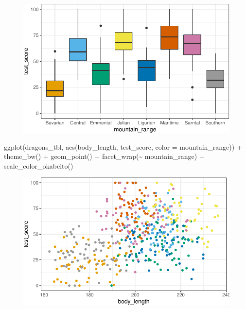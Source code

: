 \documentclass[
  letterpaper,
  DIV=11,
  oneside]{scrreport}
\newenvironment{Shaded}{\begin{snugshade}}{\end{snugshade}}
\newcommand{\AttributeTok}[1]{\textcolor[rgb]{0.40,0.45,0.13}{#1}}
\newcommand{\FunctionTok}[1]{\textcolor[rgb]{0.28,0.35,0.67}{#1}}
\newcommand{\NormalTok}[1]{\textcolor[rgb]{0.00,0.23,0.31}{#1}}
\newcommand{\SpecialCharTok}[1]{\textcolor[rgb]{0.37,0.37,0.37}{#1}}
\begin{document}
\begin{figure}[H]

{\centering \includegraphics{./stat-modeling-mixed_files/figure-pdf/unnamed-chunk-10-1.pdf}

}

\end{figure}

\begin{Shaded}
\begin{Highlighting}[]
\FunctionTok{ggplot}\NormalTok{(dragons\_tbl, }\FunctionTok{aes}\NormalTok{(body\_length, test\_score, }\AttributeTok{color =}\NormalTok{ mountain\_range)) }\SpecialCharTok{+} 
  \FunctionTok{theme\_bw}\NormalTok{() }\SpecialCharTok{+}
  \FunctionTok{geom\_point}\NormalTok{() }\SpecialCharTok{+} 
  \FunctionTok{facet\_wrap}\NormalTok{(}\SpecialCharTok{\textasciitilde{}}\NormalTok{ mountain\_range) }\SpecialCharTok{+}
  \FunctionTok{scale\_color\_okabeito}\NormalTok{()}
\end{Highlighting}
\end{Shaded}

\begin{figure}[H]

{\centering \includegraphics{./stat-modeling-mixed_files/figure-pdf/unnamed-chunk-11-1.pdf}

}

\end{figure}
\end{document}

